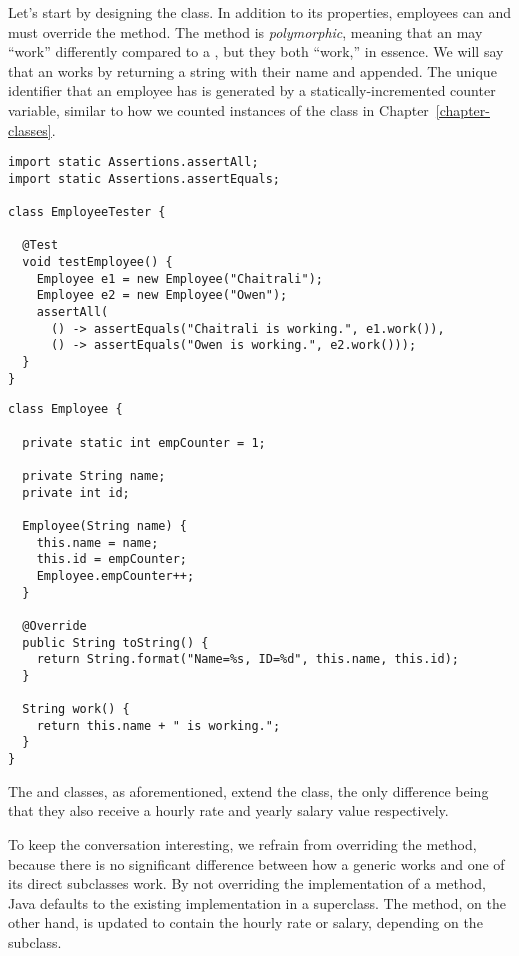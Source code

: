 Let's start by designing the  class. 
In addition to its properties, employees can  and must override the  method. 
The  method is \emph{polymorphic}, meaning that an  may ``work'' differently compared to a , but they both ``work,'' in essence. 
We will say that an  works by returning a string with their name and  appended. 
The unique identifier that an employee has is generated by a statically-incremented counter variable, similar to how we counted instances of the  class in Chapter~\ref{chapter-classes}.

\begin{lstlisting}[language=MyJava]
import static Assertions.assertAll;
import static Assertions.assertEquals;

class EmployeeTester {

  @Test
  void testEmployee() {
    Employee e1 = new Employee("Chaitrali");
    Employee e2 = new Employee("Owen");
    assertAll(
      () -> assertEquals("Chaitrali is working.", e1.work()),
      () -> assertEquals("Owen is working.", e2.work()));
  }
}
\end{lstlisting}

\begin{lstlisting}[language=MyJava]
class Employee {

  private static int empCounter = 1;

  private String name;
  private int id;

  Employee(String name) {
    this.name = name;
    this.id = empCounter;
    Employee.empCounter++;
  }

  @Override
  public String toString() {
    return String.format("Name=%s, ID=%d", this.name, this.id);
  } 

  String work() {
    return this.name + " is working.";
  }
}
\end{lstlisting}

The  and  classes, as aforementioned, extend the  class, the only difference being that they also receive a hourly rate and yearly salary value respectively. 

To keep the conversation interesting, we refrain from overriding the  method, because there is no significant difference between how a generic  works and one of its direct subclasses work. 
By not overriding the implementation of a method, Java defaults to the existing implementation in a superclass. 
The  method, on the other hand, is updated to contain the hourly rate or salary, depending on the subclass.

